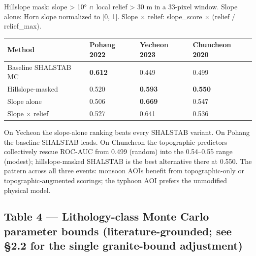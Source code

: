 \documentclass[11pt,a4paper]{article}
\newcounter{none}
\begin{document}
Hillslope mask: slope \textgreater{} 10° ∩ local relief \textgreater{} 30 m in a 33-pixel window. Slope alone: Horn slope normalized to {[}0, 1{]}. Slope × relief: slope\_score × (relief / relief\_max).

{\def\LTcaptype{none} %
\begin{longtable}[]{@{}llll@{}}
\toprule\noalign{}
Method & Pohang 2022 & Yecheon 2023 & Chuncheon 2020 \\
\midrule\noalign{}
\endhead
\bottomrule\noalign{}
\endlastfoot
Baseline SHALSTAB MC & \textbf{0.612} & 0.449 & 0.499 \\
Hillslope-masked & 0.520 & \textbf{0.593} & \textbf{0.550} \\
Slope alone & 0.506 & \textbf{0.669} & 0.547 \\
Slope × relief & 0.527 & 0.641 & 0.536 \\
\end{longtable}
}

On Yecheon the slope-alone ranking beats every SHALSTAB variant. On Pohang the baseline SHALSTAB leads. On Chuncheon the topographic predictors collectively rescue ROC-AUC from 0.499 (random) into the 0.54--0.55 range (modest); hillslope-masked SHALSTAB is the best alternative there at 0.550. The pattern across all three events: monsoon AOIs benefit from topographic-only or topographic-augmented scorings; the typhoon AOI prefers the unmodified physical model.

\subsection{Table 4 --- Lithology-class Monte Carlo parameter bounds (literature-grounded; see §2.2 for the single granite-bound adjustment)}\label{table-4-lithology-class-monte-carlo-parameter-bounds-literature-grounded-see-2.2-for-the-single-granite-bound-adjustment}
\end{document}
